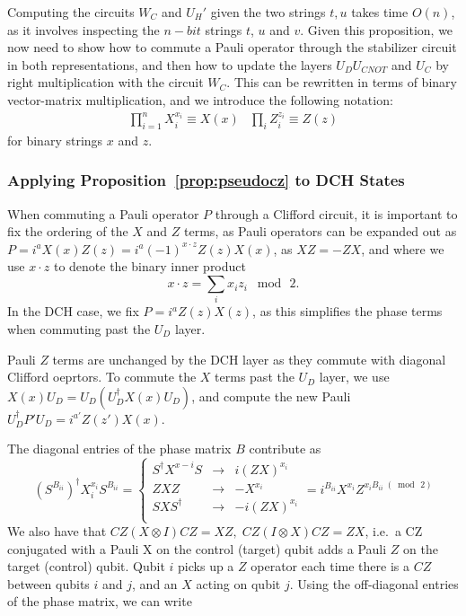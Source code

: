 Computing the circuits $W_{C}$ and $U_{H}'$ given the two strings $t,u$ takes time $O(n)$, as it involves inspecting the $n-bit$ strings $t$, $u$ and $v$. Given this proposition, we now need to show how to commute a Pauli operator through the stabilizer circuit in both representations, and then how to update the layers $U_{D}U_{CNOT}$ and $U_{C}$ by right multiplication with the circuit $W_{C}$. This can be rewritten in terms of binary vector-matrix multiplication, and we introduce the following notation:
\[
\begin{array}{lr}
\prod_{i=1}^{n}X_{i}^{x_{i}} \equiv X(x) & \prod_{i}Z_{i}^{z_{i}} \equiv Z(z)
\end{array}
\]
for binary strings $x$ and $z$.
\subsubsection*{Applying Proposition~\ref{prop:pseudocz} to DCH States}
When commuting a Pauli operator $P$ through a Clifford circuit, it is important to fix the ordering of the $X$ and $Z$ terms, as Pauli operators can be expanded out as $P=i^{a}X(x)Z(z) = i^{a}(-1)^{x\cdot z}Z(z)X(x)$, as $XZ=-ZX$, and where we use $x\cdot z$ to denote the binary inner product
\[x\cdot z = \sum_{i}x_{i}z_{i}\;\bmod\,2.\]
In the DCH case, we fix $P=i^{a}Z(z)X(z)$, as this simplifies the phase terms when commuting past the $U_{D}$ layer.\par
Pauli $Z$ terms are unchanged by the DCH layer as they commute with diagonal Clifford oeprtors. To commute the $X$ terms past the $U_{D}$ layer, we use $X(x)U_{D} = U_{D}\left(U_{D}^{\dagger}X(x)U_{D}\right)$, and compute the new Pauli $U_{D}^{\dagger}P'U_{D}=i^{a'}Z(z')X(x)$.\par
The diagonal entries of the phase matrix $B$ contribute as
\[(S^{B_{ii}})^{\dagger} X_{i}^{x_{i}} S^{B_{ii}} = \left\{
\begin{array}{rcl}
S^{\dagger}X^{x-{i}} S & \rightarrow & i(ZX)^{x_{i}} \\
ZXZ & \rightarrow & -X^{x_{i}}\\
SXS^{\dagger} & \rightarrow & -i (ZX)^{x_{i}}\\
\end{array} = i^{B_{ii}}X^{x_{i}}Z^{x_{i}B_{ii}\;(\bmod\,2)}
\right.\]
We also have that $CZ (X\otimes I) CZ = XZ,\;CZ(I\otimes X)CZ=ZX$, i.e.~a CZ conjugated with a Pauli X on the control (target) qubit adds a Pauli $Z$ on the target (control) qubit. Qubit $i$ picks up a $Z$ operator each time there is a $CZ$ between qubits $i$ and $j$, and an $X$ acting on qubit $j$. Using the off-diagonal entries of the phase matrix, we can write
